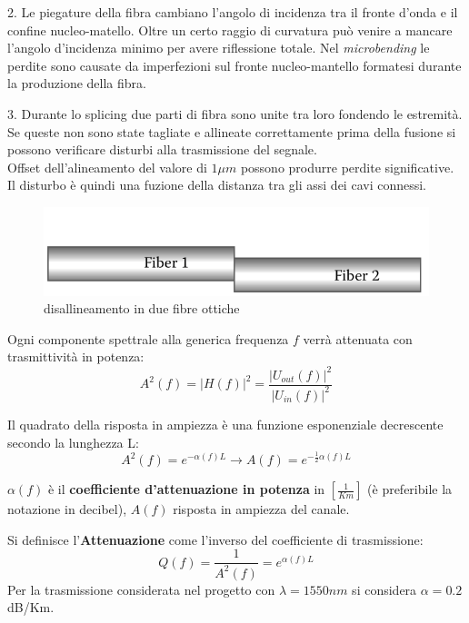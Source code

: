 \documentclass[12pt, a4paper]{article}
\begin{document}
2. Le piegature della fibra cambiano l'angolo di incidenza tra il fronte d'onda e il confine nucleo-matello. Oltre un certo raggio di curvatura può venire a mancare l'angolo d'incidenza minimo per avere riflessione totale.
Nel \textit{microbending} le perdite sono causate da imperfezioni sul fronte nucleo-mantello formatesi durante la produzione della fibra.

\vspace{5mm}
3. Durante lo splicing due parti di fibra sono unite tra loro fondendo le estremità. Se queste non sono state tagliate e allineate correttamente prima della fusione si possono verificare disturbi alla trasmissione del segnale.\\
Offset dell'alineamento del valore di $1\mu m$ possono produrre perdite significative. Il disturbo è quindi una fuzione della distanza tra gli assi dei cavi connessi.

\begin{figure}[h!]
\centering
\includegraphics[scale=0.4]{splicing.png}
\caption{disallineamento in due fibre ottiche}
\end{figure}

Ogni componente spettrale alla generica frequenza $f$ verrà attenuata con trasmittività in potenza:
\begin{equation}
	A^2(f) = |H(f)|^2 = \frac{|U_{out}(f)|^2}{|U_{in}(f)|^2}
\end{equation}

Il quadrato della risposta in ampiezza è una funzione esponenziale decrescente secondo la lunghezza L:
\begin{equation}
	A^2(f) = e^{-\alpha(f)L}  \rightarrow A(f) = e^{-\frac{1}{2}\alpha(f)L}
\end{equation}

$\alpha(f)$ è il \textbf{coefficiente d'attenuazione in potenza} in $[\frac{1}{Km}]$  (è preferibile la notazione in decibel), $A(f)$ risposta in ampiezza del canale.


Si definisce l'\textbf{Attenuazione} come l'inverso del coefficiente di trasmissione:
\begin{equation}\label{Q_eq}
	Q(f) = \frac{1}{A^2(f)} = e^{\alpha(f)L}
\end{equation}
Per la trasmissione considerata nel progetto con $\lambda = 1550 nm$ si considera $\alpha = 0.2 $ dB/Km.
\end{document}
